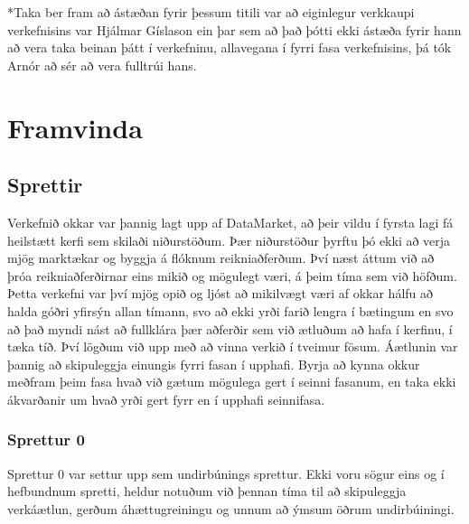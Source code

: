 \documentclass{article}
\begin{document}
*Taka ber fram að ástæðan fyrir þessum titili var að eiginlegur verkkaupi verkefnisins var Hjálmar Gíslason ein þar sem að það þótti ekki ástæða fyrir hann að vera taka beinan þátt í verkefninu, allavegana í fyrri fasa verkefnisins, þá tók Arnór að sér að vera fulltrúi hans.

\section{Framvinda}
\subsection{Sprettir}
Verkefnið okkar var þannig lagt upp af DataMarket, að þeir vildu í fyrsta lagi
fá heilstætt kerfi sem skilaði niðurstöðum. 
Þær niðurstöður þyrftu þó ekki að verja mjög marktækar og byggja á flóknum
reikniaðferðum. Því næst áttum við að þróa reikniaðferðirnar eins 
mikið og mögulegt væri, á þeim tíma sem við höfðum. Þetta verkefni var því mjög
opið og ljóst að mikilvægt væri 
af okkar hálfu að halda góðri yfirsýn allan tímann, svo að ekki yrði farið
lengra í bætingum en svo að það myndi nást að fullklára þær 
aðferðir sem við ætluðum að hafa í kerfinu, í tæka tíð. Því lögðum við upp með
að vinna verkið í tveimur fösum. Áætlunin var þannig að skipuleggja
einungis fyrri fasan í upphafi. Byrja að kynna okkur meðfram þeim fasa hvað við
gætum mögulega gert í seinni fasanum, en taka ekki ákvarðanir 
um hvað yrði gert fyrr en í upphafi seinnifasa.

\subsubsection{Sprettur 0}
Sprettur 0 var settur upp sem undirbúnings sprettur. Ekki voru sögur eins og í
hefbundnum spretti, heldur notuðum við þennan tíma til að 
skipuleggja verkáætlun, gerðum áhættugreiningu og unnum að ýmsum öðrum
undirbúiningi.
\end{document}
